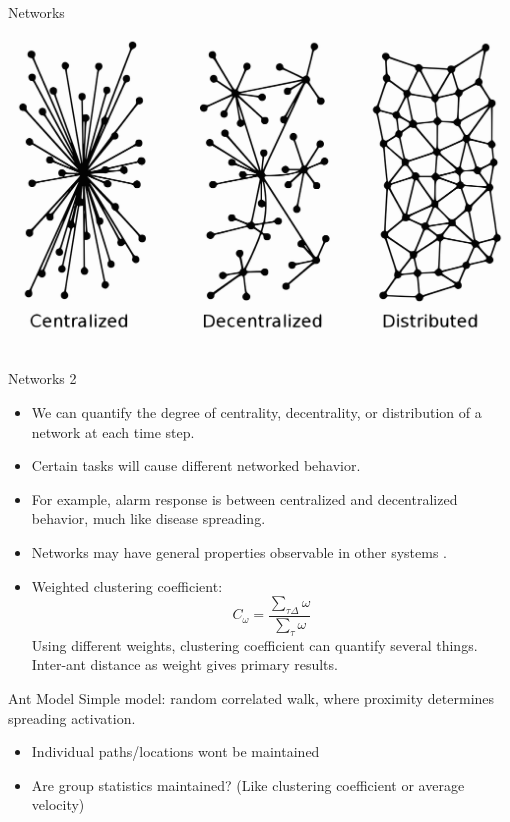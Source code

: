 \documentclass{beamer}
\begin{document}
  \begin{frame}{Networks}
      \includegraphics[scale=0.25]{networks}
  \end{frame}
  \begin{frame}{Networks 2}
      \begin{itemize}
          \item We can quantify the degree of centrality, decentrality, or distribution of a network at each time step.
          \item Certain tasks will cause different networked behavior.
          \item For example, alarm response is between centralized and decentralized behavior, much like disease spreading.
          \item Networks may have general properties observable in other systems \cite{sporns_2004, watts_strogatz_2011}.
          \item Weighted clustering coefficient:
              \[
                  C_{\omega} = \frac{\sum_{\tau \Delta}^{} \omega}{\sum_{\tau}^{} \omega}
              \] \newline
              Using different weights, clustering coefficient can quantify several things. Inter-ant distance as weight gives primary results.
      \end{itemize}
  \end{frame}

  \begin{frame}{Ant Model}
      Simple model: random correlated walk, where proximity determines spreading activation.
      \begin{itemize}
          \item Individual paths/locations wont be maintained
          \item Are group statistics maintained? (Like clustering coefficient or average velocity)
      \end{itemize}
  \end{frame}
\end{document}
